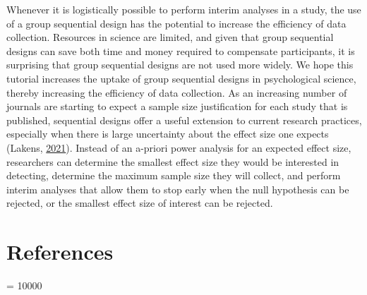\documentclass[
  english,
  ,jou, a4paper,floatsintext]{apa6}
\begin{document}
Whenever it is logistically possible to perform interim analyses in a study, the use of a group sequential design has the potential to increase the efficiency of data collection. Resources in science are limited, and given that group sequential designs can save both time and money required to compensate participants, it is surprising that group sequential designs are not used more widely. We hope this tutorial increases the uptake of group sequential designs in psychological science, thereby increasing the efficiency of data collection. As an increasing number of journals are starting to expect a sample size justification for each study that is published, sequential designs offer a useful extension to current research practices, especially when there is large uncertainty about the effect size one expects (Lakens, \protect\hyperlink{ref-lakens_sample_2021}{2021}). Instead of an a-priori power analysis for an expected effect size, researchers can determine the smallest effect size they would be interested in detecting, determine the maximum sample size they will collect, and perform interim analyses that allow them to stop early when the null hypothesis can be rejected, or the smallest effect size of interest can be rejected.

\hypertarget{references}{%
\section{References}\label{references}}

\begingroup

\interlinepenalty = 10000
\end{document}
